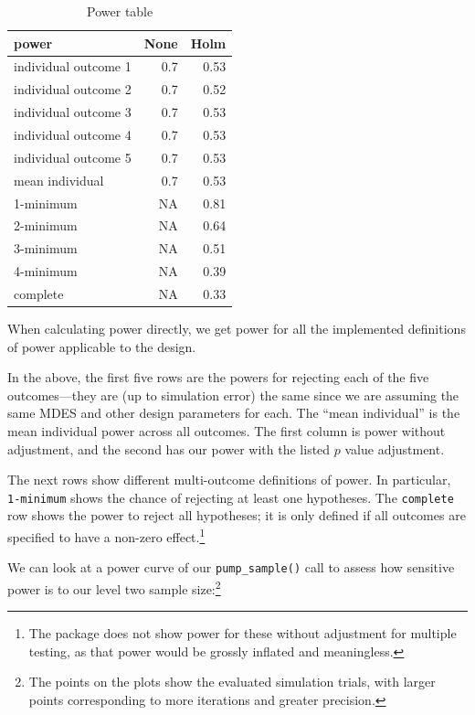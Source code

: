\documentclass[
]{jss}
\begin{document}
\begin{table}[h!]
\centering
\caption{Power table}
\centering
\begin{tabular}[t]{lrr}
\toprule
power & None & Holm\\
\midrule
individual outcome 1 & 0.7 & 0.53\\
individual outcome 2 & 0.7 & 0.52\\
individual outcome 3 & 0.7 & 0.53\\
individual outcome 4 & 0.7 & 0.53\\
individual outcome 5 & 0.7 & 0.53\\
\addlinespace
mean individual & 0.7 & 0.53\\
1-minimum & NA & 0.81\\
2-minimum & NA & 0.64\\
3-minimum & NA & 0.51\\
4-minimum & NA & 0.39\\
\addlinespace
complete & NA & 0.33\\
\bottomrule
\end{tabular}
\end{table}

When calculating power directly, we get power for all the implemented
definitions of power applicable to the design.

In the above, the first five rows are the powers for rejecting each of
the five outcomes---they are (up to simulation error) the same since we
are assuming the same MDES and other design parameters for each. The
``mean individual'' is the mean individual power across all outcomes.
The first column is power without adjustment, and the second has our
power with the listed \(p\) value adjustment.

The next rows show different multi-outcome definitions of power. In
particular, \texttt{1-minimum} shows the chance of rejecting at least
one hypotheses. The \texttt{complete} row shows the power to reject all
hypotheses; it is only defined if all outcomes are specified to have a
non-zero effect.\footnote{The package does not show power for these
  without adjustment for multiple testing, as that power would be
  grossly inflated and meaningless.}

We can look at a power curve of our \texttt{pump\_sample()} call to
assess how sensitive power is to our level two sample size:\footnote{The
  points on the plots show the evaluated simulation trials, with larger
  points corresponding to more iterations and greater precision.}
\end{document}

